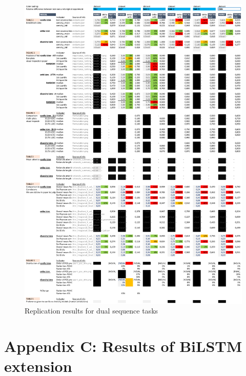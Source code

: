 \begin{figure}[h]
\includegraphics[scale=0.7, left]{./figures/repl_dst.pdf}
\caption{Replication results for dual sequence tasks}
\label{fig:repr_test2}
\end{figure}

\newpage

\section*{Appendix C: Results of BiLSTM extension}

